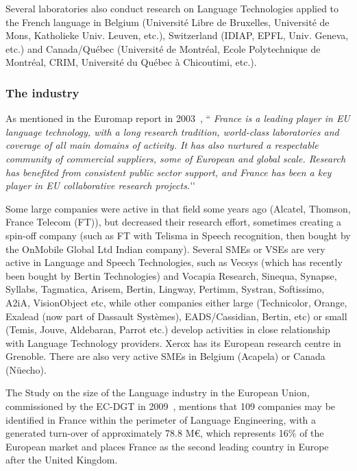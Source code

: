\begin{multicols}{2}
Several laboratories also conduct research on Language Technologies
applied to the French language in Belgium (Université  Libre de Bruxelles,
Université de Mons, Katholieke Univ. Leuven, etc.), Switzerland
(IDIAP, EPFL, Univ. Geneva, etc.) and Canada/Québec (Université de
Montréal, Ecole Polytechnique de Montréal, CRIM, Université du Québec
à Chicoutimi, etc.).

\subsubsection{The industry}

As mentioned in the Euromap report in 2003~\cite{euromap}, ``{\em
  France is a leading player in EU language technology, with a long
  research tradition, world-class laboratories and coverage of all
  main domains of activity. It has also nurtured a respectable
  community of commercial suppliers, some of European and global
  scale. Research has benefited from consistent public sector support,
  and France has been a key player in EU collaborative research
  projects.}{\mbox '}{\mbox '}

Some large companies were active in that field some years ago
(Alcatel, Thomson, France Telecom (FT)), but decreased their research
effort, sometimes creating a spin-off company (such as FT with Telisma
in Speech recognition, then bought by the OnMobile Global Ltd Indian
company). Several SMEs or VSEs are very active in Language and Speech
Technologies, such as Vecsys (which has recently been bought by Bertin
Technologies) and Vocapia Research, Sinequa, Synapse, Syllabs,
Tagmatica, Arisem, Bertin, Lingway, Pertimm, Systran, Softissimo,
A2iA, VisionObject etc, while other companies either large
(Technicolor, Orange, Exalead (now part of Dassault Systèmes),
EADS/Cassidian, Bertin, etc) or small (Temis, Jouve, Aldebaran, Parrot
etc.) develop activities in close relationship with Language
Technology providers. Xerox has its European research centre in
Grenoble. There are also very active SMEs in Belgium (Acapela) or
Canada (Nüecho).

The Study on the size of the Language industry in the European Union,
commissioned by the EC-DGT in 2009~\cite{DGT09}, mentions that 109 companies may
be identified in France within the perimeter of Language Engineering,
with a generated turn-over of approximately 78.8 M€, which represents
16\% of the European market and places France as the second leading
country in Europe after the United Kingdom.


\end{multicols}
